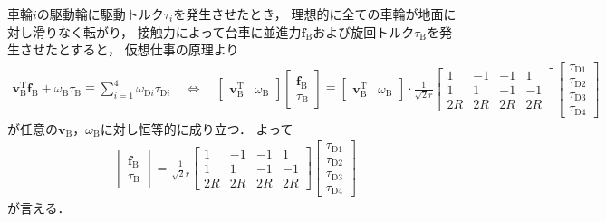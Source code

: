 ﻿\documentclass[a4paper]{jsarticle}
\begin{document}
\bigskip

車輪$i$の駆動輪に駆動トルク$\tau_{i}$を発生させたとき，
理想的に全ての車輪が地面に対し滑りなく転がり，
接触力によって台車に並進力$\bm{f}_{\mathrm{B}}$および旋回トルク$\tau_{\mathrm{B}}$を発生させたとすると，
仮想仕事の原理より
\begin{align*}
\bm{v}_{\mathrm{B}}^{\mathrm{T}}\bm{f}_{\mathrm{B}}+\omega_{\mathrm{B}}\tau_{\mathrm{B}}
\equiv\sum_{i=1}^{4}\omega_{\mathrm{D}i}\tau_{\mathrm{D}i}
\quad\Leftrightarrow\quad
\begin{bmatrix}
 \bm{v}_{\mathrm{B}}^{\mathrm{T}} & \omega_{\mathrm{B}}
\end{bmatrix}
\begin{bmatrix}
 \bm{f}_{\mathrm{B}} \\ \tau_{\mathrm{B}}
\end{bmatrix}
\equiv
\begin{bmatrix}
 \bm{v}_{\mathrm{B}}^{\mathrm{T}} & \omega_{\mathrm{B}}
\end{bmatrix}
\cdot
\frac{1}{\sqrt{2}r}
\begin{bmatrix}
 1 & -1 & -1 &  1 \\
 1 &  1 & -1 & -1 \\
2R & 2R & 2R & 2R
\end{bmatrix}
\begin{bmatrix}
 \tau_{\mathrm{D}1} \\
 \tau_{\mathrm{D}2} \\
 \tau_{\mathrm{D}3} \\
 \tau_{\mathrm{D}4}
\end{bmatrix}
\end{align*}
が任意の$\bm{v}_{\mathrm{B}}$，$\omega_{\mathrm{B}}$に対し恒等的に成り立つ．
よって
\begin{align*}
\begin{bmatrix}
 \bm{f}_{\mathrm{B}} \\ \tau_{\mathrm{B}}
\end{bmatrix}
=
\frac{1}{\sqrt{2}r}
\begin{bmatrix}
 1 & -1 & -1 &  1 \\
 1 &  1 & -1 & -1 \\
2R & 2R & 2R & 2R
\end{bmatrix}
\begin{bmatrix}
 \tau_{\mathrm{D}1} \\
 \tau_{\mathrm{D}2} \\
 \tau_{\mathrm{D}3} \\
 \tau_{\mathrm{D}4}
\end{bmatrix}
\end{align*}
が言える．
\end{document}
